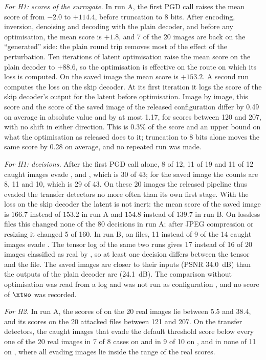 \emph{For H1: scores of the surrogate.} In run A, the first PGD call raises the mean score of \detE
from $-2.0$ to $+114.4$, before truncation to 8 bits. After encoding, inversion, denoising and
decoding with the plain decoder, and before any optimisation, the mean score is $+1.8$, and 7 of
the 20 images are back on the ``generated'' side: the plain round trip removes most of the effect
of the perturbation. Ten iterations of latent optimisation raise the mean score on the plain
decoder to $+88.6$, so the optimisation is effective on the route on which its loss is computed.
On the saved image the mean score is $+153.2$. A second run computes the loss on the skip decoder.
At its first iteration it logs the score of the skip decoder's output for the latent before
optimisation. Image by image, this score and the score of the saved image of the released
configuration differ by 0.49 on average in absolute value and by at most 1.17, for scores between
120 and 207, with no shift in either direction. This is 0.3\% of the score and an upper bound on
what the optimisation as released does to it; truncation to 8 bits alone moves the same score by
0.28 on average, and no repeated run was made.

\emph{For H1: decisions.} After the first PGD call alone, 8 of 12, 11 of 19 and 11 of 12 caught
images evade \detR, \detD and \detS, which is 30 of 43; for the saved image the counts are 8, 11
and 10, which is 29 of 43. On these 20 images the released pipeline thus evaded the transfer
detectors no more often than its own first stage. With the loss on the skip decoder the latent is
not inert: the mean score of the saved image is $166.7$ instead of $153.2$ in run A and $154.8$
instead of $139.7$ in run B. On lossless files this changed none of the 80 decisions in run A;
after JPEG compression or resizing it changed 5 of 160. In run B, on files, 11 instead of 9 of the
14 caught images evade \detR. The tensor log of the same two runs gives 17 instead of 16 of 20
images classified as real by \detR, so at least one decision differs between the tensor and the
file. The saved images are closer to their inputs (PSNR 34.0~dB) than the outputs of the plain
decoder are (24.1~dB). The comparison without optimisation was read from a log and was not run as
configuration , and no score of $\xtwo$ was recorded.

\emph{For H2.} In run A, the scores of \detE on the 20 real images lie between 5.5 and 38.4, and
its scores on the 20 attacked files between 121 and 207. On the transfer detectors, the caught
images that evade the default threshold score below every one of the 20 real images in 7 of 8
cases on \detR and in 9 of 10 on \detS, and in none of 11 on \detD, where all evading images lie
inside the range of the real scores.

